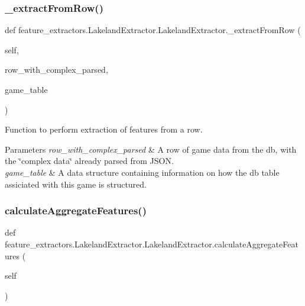 \subsubsection{\texorpdfstring{\_extractFromRow()}{\_extractFromRow()}}
{\footnotesize\ttfamily def feature\+\_\+extractors.\+Lakeland\+Extractor.\+Lakeland\+Extractor.\+\_\+extract\+From\+Row (\begin{DoxyParamCaption}\item[{}]{self,  }\item[{}]{row\+\_\+with\+\_\+complex\+\_\+parsed,  }\item[{\mbox{\hyperlink{class_game_table_1_1_game_table}{Game\+Table}}}]{game\+\_\+table }\end{DoxyParamCaption})\hspace{0.3cm}{\ttfamily [private]}}



Function to perform extraction of features from a row. 


\begin{DoxyParams}{Parameters}
{\em row\+\_\+with\+\_\+complex\+\_\+parsed} & A row of game data from the db, with the \char`\"{}complex data\char`\"{} already parsed from J\+S\+ON. \\
\hline
{\em game\+\_\+table} & A data structure containing information on how the db table assiciated with this game is structured. \\
\hline
\end{DoxyParams}
\mbox{\label{classfeature__extractors_1_1_lakeland_extractor_1_1_lakeland_extractor_a9f6f9e4a7857cb4905f27e5dad7e1404}} 
\subsubsection{\texorpdfstring{calculateAggregateFeatures()}{calculateAggregateFeatures()}}
{\footnotesize\ttfamily def feature\+\_\+extractors.\+Lakeland\+Extractor.\+Lakeland\+Extractor.\+calculate\+Aggregate\+Features (\begin{DoxyParamCaption}\item[{}]{self }\end{DoxyParamCaption})}



